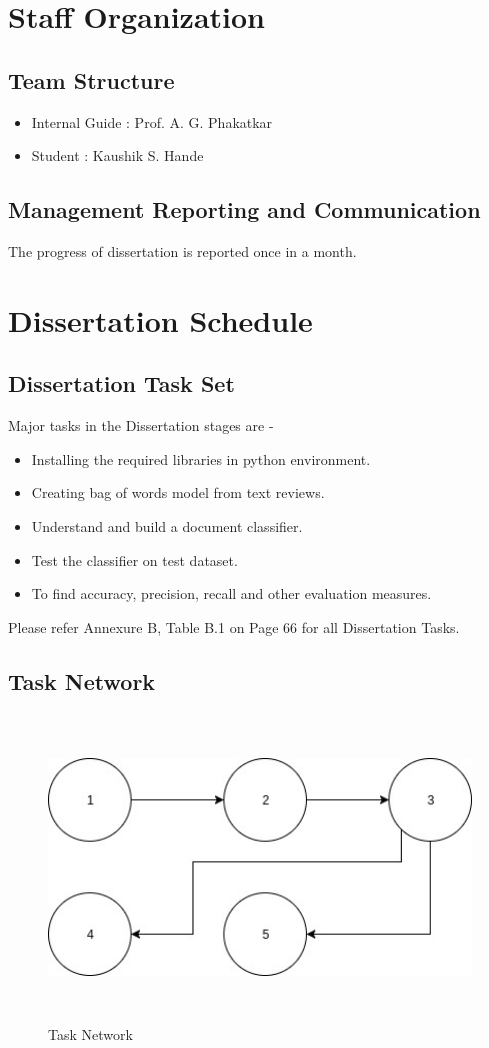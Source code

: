 \documentclass[oneside,a4paper,12pt]{pictreport}
\begin{document}
\section{Staff Organization}

\subsection{Team Structure}
\begin{itemize}
    \item Internal Guide : Prof. A. G. Phakatkar
    \item Student : Kaushik S. Hande 
\end{itemize}

\subsection{Management Reporting and Communication}
The progress of dissertation is reported once in a month.
\section{Dissertation Schedule}
\subsection{Dissertation Task Set}
Major tasks in the Dissertation stages are - 
\begin{itemize}
\item Installing the required libraries in python environment.
\item Creating bag of words model from text reviews.
\item Understand and build a document classifier.
\item Test the classifier on test dataset.
\item To find accuracy, precision, recall and other evaluation measures.
\end{itemize}
Please refer Annexure B, Table B.1 on Page 66 for all Dissertation Tasks.
\subsection{Task Network}
\begin{figure}[!h]
\centering
\includegraphics[width=5.5in,height=3.2in]{task.jpg}
\caption{Task Network}
\end{figure}
\newpage
\end{document}

